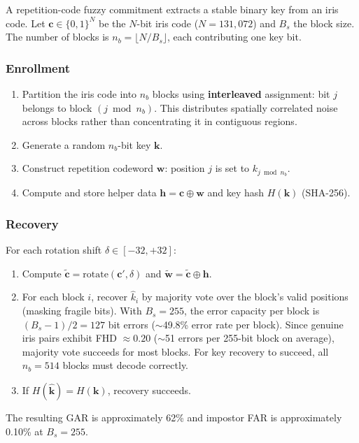A repetition-code fuzzy commitment extracts a stable binary key from an iris code.
Let $\mathbf{c} \in \{0,1\}^N$ be the $N$-bit iris code ($N = 131{,}072$) and
$B_s$ the block size. The number of blocks is $n_b = \lfloor N/B_s \rfloor$, each
contributing one key bit.

\subsubsection{Enrollment}
\begin{enumerate}
  \item Partition the iris code into $n_b$ blocks using \textbf{interleaved}
  assignment: bit $j$ belongs to block $(j \bmod n_b)$. This distributes
  spatially correlated noise across blocks rather than concentrating it in
  contiguous regions.
  \item Generate a random $n_b$-bit key $\mathbf{k}$.
  \item Construct repetition codeword $\mathbf{w}$: position $j$ is set to
  $k_{j \bmod n_b}$.
  \item Compute and store helper data $\mathbf{h} = \mathbf{c} \oplus \mathbf{w}$
  and key hash $H(\mathbf{k})$ (SHA-256).
\end{enumerate}

\subsubsection{Recovery}
For each rotation shift $\delta \in [-32, +32]$:
\begin{enumerate}
  \item Compute $\tilde{\mathbf{c}} = \mathrm{rotate}(\mathbf{c}', \delta)$ and
  $\tilde{\mathbf{w}} = \tilde{\mathbf{c}} \oplus \mathbf{h}$.
  \item For each block $i$, recover $\hat{k}_i$ by majority vote over the block's
  valid positions (masking fragile bits). With $B_s = 255$, the error capacity
  per block is $(B_s - 1)/2 = 127$ bit errors ($\sim$49.8\% error rate per block).
  Since genuine iris pairs exhibit FHD $\approx 0.20$ ($\sim$51 errors per
  255-bit block on average), majority vote succeeds for most blocks. For key
  recovery to succeed, all $n_b = 514$ blocks must decode correctly.
  \item If $H(\hat{\mathbf{k}}) = H(\mathbf{k})$, recovery succeeds.
\end{enumerate}
The resulting GAR is approximately 62\% and impostor FAR is approximately 0.10\%
at $B_s = 255$.

